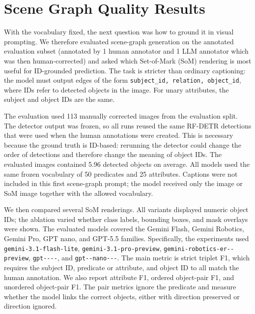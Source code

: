 \section{Scene Graph Quality Results}

With the vocabulary fixed, the next question was how to ground it in visual prompting. We therefore evaluated scene-graph generation on the annotated evaluation subset (annotated by 1 human annotator and 1 LLM annotator which was then human-corrected) and asked which Set-of-Mark (SoM) rendering is most useful for ID-grounded prediction. The task is stricter than ordinary captioning: the model must output edges of the form \texttt{subject\_id, relation, object\_id}, where IDs refer to detected objects in the image. For unary attributes, the subject and object IDs are the same.

The evaluation used 113 manually corrected images from the evaluation split. The detector output was frozen, so all runs reused the same RF-DETR detections that were used when the human annotations were created. This is necessary because the ground truth is ID-based: rerunning the detector could change the order of detections and therefore change the meaning of object IDs. The evaluated images contained 5.96 detected objects on average. %
All models used the same frozen vocabulary of 50 predicates and 25 attributes. Captions were not included in this first scene-graph prompt; the model received only the image or SoM image together with the allowed vocabulary.

We then compared several SoM renderings. All variants displayed numeric object IDs; the ablation varied whether class labels, bounding boxes, and mask overlays were shown.
The evaluated models covered the Gemini Flash, Gemini Robotics, Gemini Pro,
GPT nano, and GPT-5.5 families. Specifically, the experiments used
\texttt{gemini-3.1-\allowbreak flash-\allowbreak lite},
\texttt{gemini-3.1-\allowbreak pro-\allowbreak preview},
\texttt{gemini-\allowbreak robotics-\allowbreak er--\allowbreak preview},
\texttt{gpt----}, and
\texttt{gpt--\allowbreak nano---}.
The main metric is strict triplet F1, which requires the subject ID, predicate or attribute, and object ID to all match the human annotation. We also report attribute F1, ordered object-pair F1, and unordered object-pair F1. The pair metrics ignore the predicate and measure whether the model links the correct objects, either with direction preserved or direction ignored.

